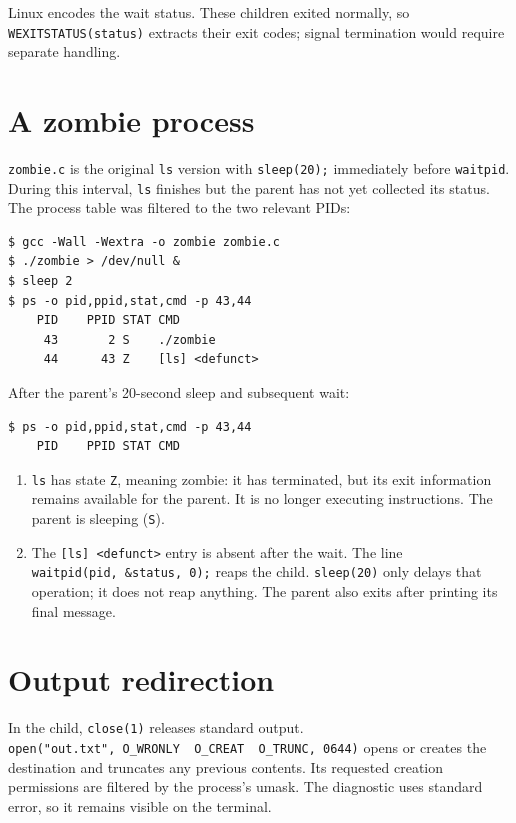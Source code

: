 \documentclass{../latex/utmreport}
\providecommand{\tightlist}{\setlength{\itemsep}{0pt}\setlength{\parskip}{0pt}}
\begin{document}
Linux encodes the wait status. These children exited normally, so \texttt{WEXITSTATUS(status)} extracts their exit codes; signal termination would require separate handling.

\chapter{A zombie process}\label{a-zombie-process}

\texttt{zombie.c} is the original \texttt{ls} version with
\texttt{sleep(20);} immediately before \texttt{waitpid}. During this
interval, \texttt{ls} finishes but the parent has not yet collected its
status. The process table was filtered to the two relevant PIDs:

\begin{lstlisting}
$ gcc -Wall -Wextra -o zombie zombie.c
$ ./zombie > /dev/null &
$ sleep 2
$ ps -o pid,ppid,stat,cmd -p 43,44
    PID    PPID STAT CMD
     43       2 S    ./zombie
     44      43 Z    [ls] <defunct>
\end{lstlisting}

After the parent's 20-second sleep and subsequent wait:

\begin{lstlisting}
$ ps -o pid,ppid,stat,cmd -p 43,44
    PID    PPID STAT CMD
\end{lstlisting}

\begin{enumerate}
\def\labelenumi{\arabic{enumi}.}
\tightlist
\item
  \texttt{ls} has state \texttt{Z}, meaning zombie: it has terminated,
  but its exit information remains available for the parent. It is no
  longer executing instructions. The parent is sleeping (\texttt{S}).
\item
  The \texttt{{[}ls{]}\ \textless{}defunct\textgreater{}} entry is
  absent after the wait. The line \texttt{waitpid(pid,\ \&status,\ 0);}
  reaps the child. \texttt{sleep(20)} only delays that operation; it
  does not reap anything. The parent also exits after printing its final
  message.
\end{enumerate}

\chapter{Output redirection}\label{output-redirection}

In the child, \texttt{close(1)} releases standard output.
\texttt{open("out.txt",\ O\_WRONLY\ \textbar{}\ O\_CREAT\ \textbar{}\ O\_TRUNC,\ 0644)}
opens or creates the destination and truncates any previous contents.
Its requested creation permissions are filtered by the process's umask.
The diagnostic uses standard error, so it remains visible on the
terminal.
\end{document}
